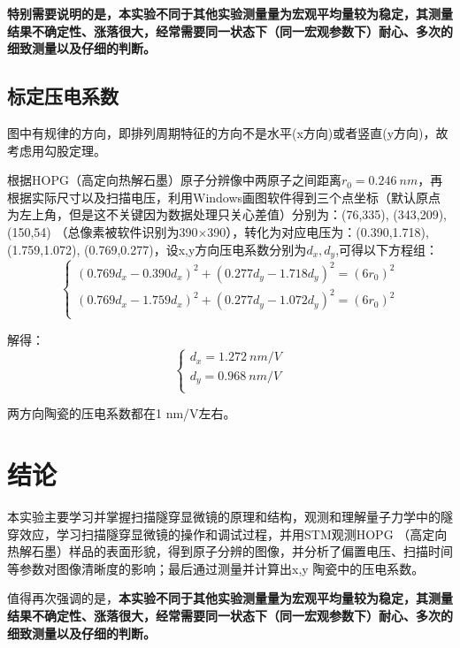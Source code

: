 \documentclass[aps,pre,12pt,preprint,onecolumn,showpacs,showkeys]{revtex4-1}
\begin{document}
\par
\textbf{特别需要说明的是，本实验不同于其他实验测量量为宏观平均量较为稳定，其测量结果不确定性、涨落很大，经常需要同一状态下（同一宏观参数下）耐心、多次的细致测量以及仔细的判断。}


\subsection{标定压电系数}
图中有规律的方向，即排列周期特征的方向不是水平(x方向)或者竖直(y方向)，故考虑用勾股定理。

根据HOPG（高定向热解石墨）原子分辨像中两原子之间距离$r_0=0.246\ nm$，再根据实际尺寸以及扫描电压，利用Windows画图软件得到三个点坐标（默认原点为左上角，但是这不关键因为数据处理只关心差值）分别为：(76,335), (343,209), (150,54) （总像素被软件识别为390$\times$390），转化为对应电压为：(0.390,1.718), (1.759,1.072), (0.769,0.277)，设x,y方向压电系数分别为$d_x,d_y$,可得以下方程组：
\begin{equation}
\begin{cases}
(0.769d_x-0.390d_x)^2+(0.277d_y-1.718d_y)^2=(6r_0)^2\\
(0.769d_x-1.759d_x)^2+(0.277d_y-1.072d_y)^2=(6r_0)^2\\
\end{cases}
\end{equation}

解得：
\begin{equation}
\begin{cases}
d_x = 1.272\ nm/V\\
d_y = 0.968\ nm/V\\
\end{cases}
\end{equation}

两方向陶瓷的压电系数都在1 nm/V左右。



\section{结论}
本实验主要学习并掌握扫描隧穿显微镜的原理和结构，观测和理解量子力学中的隧穿效应，学习扫描隧穿显微镜的操作和调试过程，并用STM观测HOPG （高定向热解石墨）样品的表面形貌，得到原子分辨的图像，并分析了偏置电压、扫描时间等参数对图像清晰度的影响；最后通过测量并计算出x,y 陶瓷中的压电系数。\par
值得再次强调的是，\textbf{本实验不同于其他实验测量量为宏观平均量较为稳定，其测量结果不确定性、涨落很大，经常需要同一状态下（同一宏观参数下）耐心、多次的细致测量以及仔细的判断。}
\end{document}
